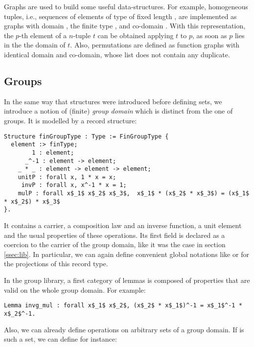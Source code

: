 Graphs are used to build some useful data-structures. For example,
homogeneous tuples, i.e., sequences of elements of type  of fixed length , 
are implemented as graphs with domain , the finite type ,
and co-domain . With this representation, the
$p$-th element of a $n$-tuple $t$ can be obtained applying $t$ to $p$,
as soon as $p$ lies in the the domain of $t$. Also, permutations
are defined as function graphs with identical domain and co-domain,
whose  list does not contain any duplicate.

\subsection{Groups}\label{ssec:groups}

In the same way that  structures were introduced before defining
sets, we introduce a notion of (finite) \emph{group domain} which is
distinct from the one of groups. It is modelled by a 
record structure:
\begin{lstlisting}
Structure finGroupType : Type := FinGroupType {
  element :> finType;
        1 : element;
      _^-1 : element -> element;
    _ * _ : element -> element -> element;
    unitP : forall x, 1 * x = x;
     invP : forall x, x^-1 * x = 1;
    mulP : forall x$_1$ x$_2$ x$_3$,  x$_1$ * (x$_2$ * x$_3$) = (x$_1$ * x$_2$) * x$_3$
}.
\end{lstlisting}
It contains a carrier, a composition law
and an inverse function, a unit element and the usual properties of these
operations. Its first field is declared as a coercion to the carrier
of the group domain, like it was the case  in section
\ref{ssec:lib}. In particular, we can again define convenient global notations
like \C{*} or  for the projections of this record type.

In the group library, a first category of lemmas is composed of 
properties that are valid on the whole group domain. For example:

\begin{lstlisting}
Lemma invg_mul : forall x$_1$ x$_2$, (x$_2$ * x$_1$)^-1 = x$_1$^-1 * x$_2$^-1. 
\end{lstlisting}

Also, we can already define operations on arbitrary sets of a group
domain. If  is such a set, we can define for instance:

